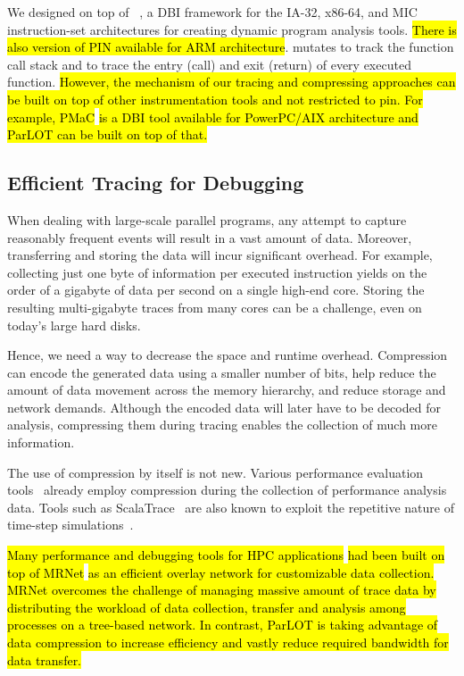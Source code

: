  
%


We designed \parlot on top of \pin~\cite{pin}, a DBI framework for the IA-32, x86-64, and MIC instruction-set architectures for creating dynamic program analysis tools.\hl{ There is also version of PIN available for ARM architecture}\cite{pinarm}. \parlot mutates \pin to track the function call stack and to trace the entry (call) and exit (return) of every executed function. \hl{However, the mechanism of our tracing and compressing approaches can be built on top of other instrumentation tools and not restricted to pin. For example, PMaC }\cite{pmac} \hl{ is a DBI tool available for PowerPC/AIX architecture and ParLOT can be built on top of that.}


\subsection{Efficient Tracing for Debugging}
When dealing with large-scale parallel programs, any attempt to capture reasonably frequent events will result in a vast amount of data. Moreover, transferring and storing the data will incur significant overhead. For example, collecting just one byte of information per executed instruction yields on the order of a gigabyte of data per second on a single high-end core. Storing the resulting multi-gigabyte traces from many cores can be a challenge, even on today's large hard disks.

Hence, we need a way to decrease the space and runtime overhead. Compression can encode the generated data using a smaller number of bits, help
reduce the amount of data movement across the memory hierarchy, and
reduce storage and network demands.
%
Although the encoded data will later have to be decoded for analysis, compressing them during tracing enables the collection of much more information.

The use of compression by itself is not new.
Various performance evaluation tools~\cite{tau,scorep,eventflowgraph} 
already employ compression during the collection
of performance analysis data.
%
Tools such as ScalaTrace~\cite{scalatrace}
are also known to exploit
the repetitive nature of time-step simulations~\cite{freitag}. %

\hl{
Many performance and debugging tools for HPC applications} \cite{stat,taumrnet}\hl{ had been built on top of MRNet}\cite{mrnet}\hl{ as an efficient overlay network for customizable data collection. MRNet overcomes the challenge of managing massive amount of trace data by distributing the workload of data collection, transfer and analysis among processes on a tree-based network. In contrast, ParLOT is taking advantage of data compression to increase efficiency and vastly reduce required bandwidth for data transfer. }

